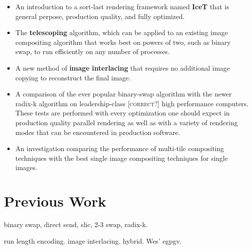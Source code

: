 \documentclass[letterpaper,twocolumn,10pt]{article}
\newcommand*{\keyterm}[1]{\textbf{#1}}
\newcommand{\sticky}[1]{{\color{red}\textsc{[#1]}}}
\begin{document}
\begin{itemize}
\item An introduction to a sort-last rendering framework named
  \keyterm{IceT} that is general perpose, production quality, and fully
  optimized.
\item The \keyterm{telescoping} algorithm, which can be applied to an
  existing image compositing algorithm that works best on powers of two,
  such as binary swap, to run efficiently on any number of processes.
\item A new method of \keyterm{image interlacing} that requires no
  additional image copying to reconstruct the final image.
\item A comparison of the ever popular binary-swap algorithm with the newer
  radix-k algorithm on leadership-class \sticky{correct?} high performance
  computers.  These tests are performed with every optimization one should
  expect in production quality parallel rendering as well as with a variety
  of rendering modes that can be encountered in production software.
\item An investigation comparing the performance of multi-tile compositing
  techniques \cite{2001 paper} with the best single image compositing
  techniques for single images.
\end{itemize}

\section{Previous Work}

binary swap, direct send, slic, 2-3 swap, radix-k.

run length encoding. image interlacing.  hybrid.  Wes' egpgv.
\end{document}
